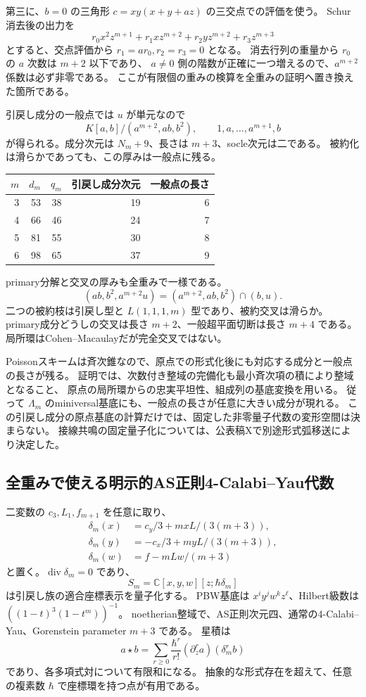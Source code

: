 第三に、$b=0$ の三角形 $c=xy(x+y+az)$ の三交点での評価を使う。
Schur消去後の出力を
\[
 r_0x^2z^{m+1}+r_1xz^{m+2}+r_2yz^{m+2}+r_3z^{m+3}
\]
とすると、交点評価から $r_1=ar_0,r_2=r_3=0$ となる。
消去行列の重量から $r_0$ の $a$ 次数は $m+2$ 以下であり、
$a\ne0$ 側の階数が正確に一つ増えるので、$a^{m+2}$ 係数は必ず非零である。
ここが有限個の重みの検算を全重みの証明へ置き換えた箇所である。

引戻し成分の一般点では $u$ が単元なので
\[
 K[a,b]/(a^{m+2},ab,b^2),\qquad
 1,a,\ldots,a^{m+1},b
\]
が得られる。成分次元は $N_m+9$、長さは $m+3$、socle次元は二である。
被約化は滑らかであっても、この厚みは一般点に残る。

\begin{center}\small
\begin{tabular}{rrrrr}\toprule
$m$&$d_m$&$q_m$&引戻し成分次元&一般点の長さ\\\midrule
3&53&38&19&6\\
4&66&46&24&7\\
5&81&55&30&8\\
6&98&65&37&9\\\bottomrule
\end{tabular}
\end{center}

primary分解と交叉の厚みも全重みで一様である。
\[
 (ab,b^2,a^{m+2}u)=(a^{m+2},ab,b^2)\cap(b,u).
\]
二つの被約枝は引戻し型と $L(1,1,1,m)$ 型であり、被約交叉は滑らか。
primary成分どうしの交叉は長さ $m+2$、一般超平面切断は長さ $m+4$ である。
局所環はCohen--Macaulayだが完全交叉ではない。

Poissonスキームは斉次錐なので、原点での形式化後にも対応する成分と一般点の長さが残る。
証明では、次数付き整域の完備化も最小斉次項の積により整域となること、
原点の局所環からの忠実平坦性、組成列の基底変換を用いる。
従って $\Lambda_m$ のminiversal基底にも、一般点の長さが任意に大きい成分が現れる。
この引戻し成分の原点基底の計算だけでは、固定した非零量子代数の変形空間は決まらない。
接線共鳴の固定量子化については、公表稿Xで別途形式弧移送により決定した。

\subsection{全重みで使える明示的AS正則4-Calabi--Yau代数}
二変数の $c_3,L_1,f_{m+1}$ を任意に取り、
\[
 \begin{split}
 \delta_m(x)&=c_y/3+mxL/(3(m+3)),\\
 \delta_m(y)&=-c_x/3+myL/(3(m+3)),\\
 \delta_m(w)&=f-mLw/(m+3)
 \end{split}
\]
と置く。$\operatorname{div}\delta_m=0$ であり、
\[
 S_m=\mathbb C[x,y,w][z;\hbar\delta_m]
\]
は引戻し族の適合座標表示を量子化する。
PBW基底は $x^iy^jw^kz^\ell$、Hilbert級数は $((1-t)^3(1-t^m))^{-1}$。
noetherian整域で、AS正則次元四、通常の4-Calabi--Yau、Gorenstein parameter $m+3$ である。
星積は
\[
 a\star b=\sum_{r\ge0}\frac{\hbar^r}{r!}
                 (\partial_z^r a)(\delta_m^r b)
\]
であり、各多項式対について有限和になる。
抽象的な形式存在を超えて、任意の複素数 $\hbar$ で座標環を持つ点が有用である。

